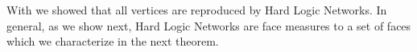 




With  we showed that all vertices are reproduced by Hard Logic Networks.
In general, as we show next, Hard Logic Networks are face measures to a set of faces which we characterize in the next theorem.

